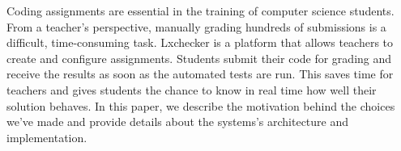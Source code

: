 
Coding assignments are essential in the training of computer science students. From a teacher's perspective, manually grading hundreds of submissions is a difficult, time-consuming task. Lxchecker is a platform that allows teachers to create and configure assignments. Students submit their code for grading and receive the results as soon as the automated tests are run. This saves time for teachers and gives students the chance to know in real time how well their solution behaves. In this paper, we describe the motivation behind the choices we've made and provide details about the systems's architecture and implementation.
